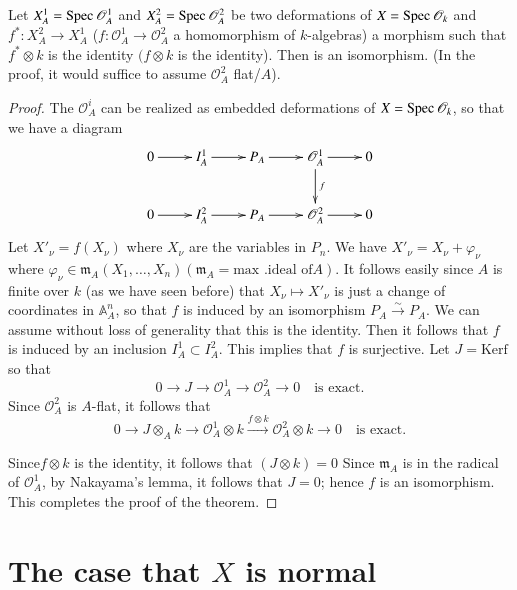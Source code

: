 {\begin{lemma}\label{part1-lem8.2}%
Let $X^1_A=\operatorname{Spec} \mathscr{O}^1_A$ and
$X^{2}_A=\operatorname{Spec} \mathscr{O}^{2}_A$ be two deformations of
$X=\operatorname{Spec} \mathscr{O}_k$ and $f^{\ast}:X^{2}_A\to X^1_A$
($f:\mathscr{O}^1_A\to \mathscr{O}^{2}_A$ a homomorphism of
$k$-algebras) a morphism such that $f^{\ast}\otimes k$ is the identity
$(f \otimes k$ is the identity). Then is an isomorphism. (In the
proof, it would suffice to assume $\mathscr{O}^{2}_A$ flat/$A$). 
\end{lemma}

\begin{proof}
The $\mathscr{O}^{i}_A$ can be realized as embedded deformations of
$X=\break\Spec \mathscr{O}_k$, so that we have a diagram 
\begin{equation*}
\xymatrix{
0\ar [r]& I^{1}_A\ar [r] &P_A\ar [r] &\mathscr{O}^{1}_A\ar [d]^{f}\ar[r]&0\\
0\ar[r]&I^{2}_A\ar [r]&P_A\ar [r]&\mathscr{O}^{2}_A\ar [r] &0
}
\end{equation*}
Let $X'_{\nu}=f(X_{\nu})$ where $X_{\nu}$ are the variables in
$P_n$. We have $X'_{\nu}=X_{\nu}+\varphi_{\nu}$ where
$\varphi_{\nu}\in \mathfrak{m}_A(X_1,\ldots, X_n)(\mathfrak{m}
_{A}=\text{max .ideal of} A)$. It follows easily since $A$ is finite
over $k$ (as we have seen before) that $X_{\nu}\mapsto X'_{\nu}$ is
just a change of coordinates in $\mathbb{A}^{n}_A$, so that $f$ is
induced by an isomorphism $P_A\xrightarrow{\sim} P_A$. We can assume
without loss of generality that this is the identity. Then it follows
that $f$ is induced by an inclusion $I^{1}_A\subset I^{2}_A$. This
implies that $f$ is surjective. Let $J=\text{Kerf}$ so that 
$$
0\to J\to \mathscr{O}^{1}_A\to \mathscr{O}^{2}_A\to 0\quad \text{is exact}.
$$
Since $\mathscr{O}^{2}_A$ is $A$-flat, it follows that
$$
0\to J \otimes_A k\to \mathscr{O}^{1}_A\otimes
k \xrightarrow{f \otimes k}\mathscr{O}^{2}_A \otimes k \to
0\quad\text{is exact}. 
$$

Since\pageoriginale $f\otimes k$ is the identity, it follows that
$(J\otimes k)=0$ Since $\mathfrak{m}_A$ is in the radical of
$\mathscr{O}^1_A$, by Nakayama's lemma, it follows that $J=0$; hence
$f$ is an isomorphism. 
This completes the proof of the theorem.
\end{proof}

\section{The case that $X$ is normal}\label{part1-sec9}
 
}
